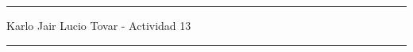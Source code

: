 \documentclass[12pt]{article}
\begin{document}
\hrule
\begin{center}
    Karlo Jair Lucio Tovar - Actividad 13\\
\end{center}
\hrule
\vspace*{.8cm}


\end{document}
